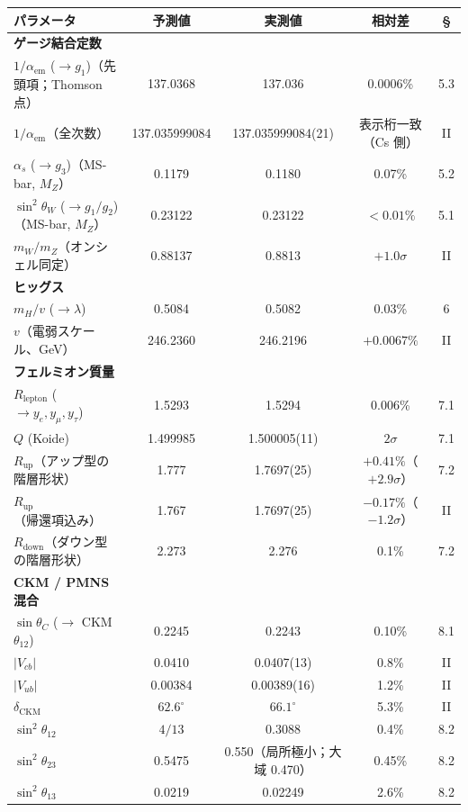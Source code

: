 \documentclass[fontsize=11pt,paper=a4,lualatex]{jlreq}
\begin{document}
\begin{center}\scriptsize\setlength{\tabcolsep}{3pt}
\begin{tabular}{@{}lcccc@{}}
\toprule
パラメータ & 予測値 & 実測値 & 相対差 & \S \\
\midrule
\textbf{ゲージ結合定数} & & & & \\
$1/\alpha_\mathrm{em}$ ($\to g_1$)（先頭項；Thomson 点） & 137.0368 & 137.036 & 0.0006\% & 5.3 \\
$1/\alpha_\mathrm{em}$（全次数） & 137.035999084 & 137.035999084(21) & 表示桁一致（Cs 側） & II \\
$\alpha_s$ ($\to g_3$)（MS-bar, $M_Z$） & 0.1179 & 0.1180 & 0.07\% & 5.2 \\
$\sin^2\!\theta_W$ ($\to g_1/g_2$)（MS-bar, $M_Z$） & 0.23122 & 0.23122 & $<0.01\%$ & 5.1 \\
$m_W/m_Z$（オンシェル同定） & 0.88137 & 0.8813 & $+1.0\sigma$ & II \\
\textbf{ヒッグス} & & & & \\
$m_H/v$ ($\to\lambda$) & 0.5084 & 0.5082 & 0.03\% & 6 \\
$v$（電弱スケール、GeV） & 246.2360 & 246.2196 & $+0.0067\%$ & II \\
\textbf{フェルミオン質量} & & & & \\
$R_\mathrm{lepton}$ ($\to y_e, y_\mu, y_\tau$) & 1.5293 & 1.5294 & 0.006\% & 7.1 \\
$Q$ (Koide) & 1.499985 & 1.500005(11) & $2\sigma$ & 7.1 \\
$R_\mathrm{up}$（アップ型の階層形状） & 1.777 & 1.7697(25) & $+0.41\%$（$+2.9\sigma$） & 7.2 \\
$R_\mathrm{up}$（帰還項込み） & 1.767 & 1.7697(25) & $-0.17\%$（$-1.2\sigma$） & II \\
$R_\mathrm{down}$（ダウン型の階層形状） & 2.273 & 2.276 & 0.1\% & 7.2 \\
\textbf{CKM / PMNS 混合} & & & & \\
$\sin\theta_C$ ($\to$ CKM $\theta_{12}$) & 0.2245 & 0.2243 & 0.10\% & 8.1 \\
$|V_{cb}|$ & 0.0410 & 0.0407(13) & 0.8\% & II \\
$|V_{ub}|$ & 0.00384 & 0.00389(16) & 1.2\% & II \\
$\delta_\mathrm{CKM}$ & $62.6^\circ$ & $66.1^\circ$ & 5.3\% & II \\
$\sin^2\!\theta_{12}$ & $4/13$ & 0.3088 & 0.4\% & 8.2 \\
$\sin^2\!\theta_{23}$ & 0.5475 & 0.550（局所極小；大域 0.470） & 0.45\% & 8.2 \\
$\sin^2\!\theta_{13}$ & 0.0219 & 0.02249 & 2.6\% & 8.2 \\
\bottomrule
\end{tabular}
\end{center}
\end{document}
